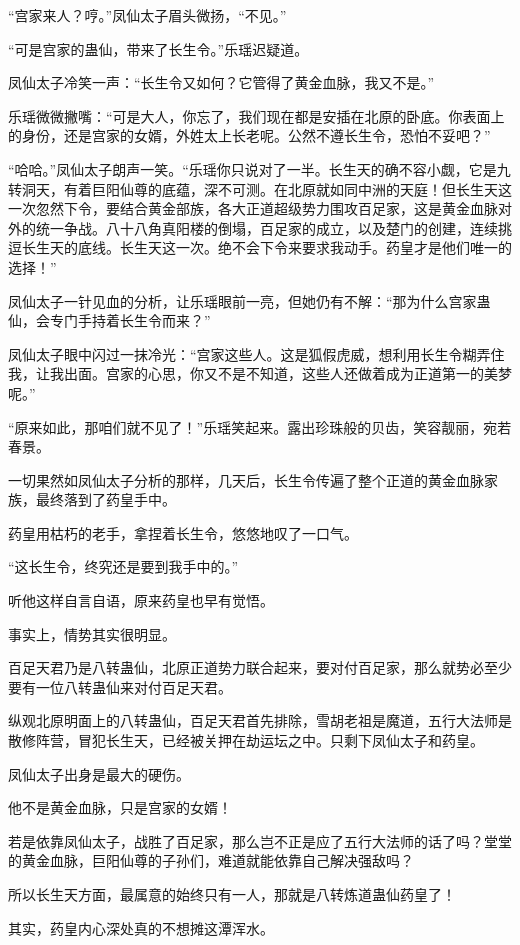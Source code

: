 \begin{this_body}
“宫家来人？哼。”凤仙太子眉头微扬，“不见。”

“可是宫家的蛊仙，带来了长生令。”乐瑶迟疑道。

凤仙太子冷笑一声：“长生令又如何？它管得了黄金血脉，我又不是。”

乐瑶微微撇嘴：“可是大人，你忘了，我们现在都是安插在北原的卧底。你表面上的身份，还是宫家的女婿，外姓太上长老呢。公然不遵长生令，恐怕不妥吧？”

“哈哈。”凤仙太子朗声一笑。“乐瑶你只说对了一半。长生天的确不容小觑，它是九转洞天，有着巨阳仙尊的底蕴，深不可测。在北原就如同中洲的天庭！但长生天这一次忽然下令，要结合黄金部族，各大正道超级势力围攻百足家，这是黄金血脉对外的统一争战。八十八角真阳楼的倒塌，百足家的成立，以及楚门的创建，连续挑逗长生天的底线。长生天这一次。绝不会下令来要求我动手。药皇才是他们唯一的选择！”

凤仙太子一针见血的分析，让乐瑶眼前一亮，但她仍有不解：“那为什么宫家蛊仙，会专门手持着长生令而来？”

凤仙太子眼中闪过一抹冷光：“宫家这些人。这是狐假虎威，想利用长生令糊弄住我，让我出面。宫家的心思，你又不是不知道，这些人还做着成为正道第一的美梦呢。”

“原来如此，那咱们就不见了！”乐瑶笑起来。露出珍珠般的贝齿，笑容靓丽，宛若春景。

一切果然如凤仙太子分析的那样，几天后，长生令传遍了整个正道的黄金血脉家族，最终落到了药皇手中。

药皇用枯朽的老手，拿捏着长生令，悠悠地叹了一口气。

“这长生令，终究还是要到我手中的。”

听他这样自言自语，原来药皇也早有觉悟。

事实上，情势其实很明显。

百足天君乃是八转蛊仙，北原正道势力联合起来，要对付百足家，那么就势必至少要有一位八转蛊仙来对付百足天君。

纵观北原明面上的八转蛊仙，百足天君首先排除，雪胡老祖是魔道，五行大法师是散修阵营，冒犯长生天，已经被关押在劫运坛之中。只剩下凤仙太子和药皇。

凤仙太子出身是最大的硬伤。

他不是黄金血脉，只是宫家的女婿！

若是依靠凤仙太子，战胜了百足家，那么岂不正是应了五行大法师的话了吗？堂堂的黄金血脉，巨阳仙尊的子孙们，难道就能依靠自己解决强敌吗？

所以长生天方面，最属意的始终只有一人，那就是八转炼道蛊仙药皇了！

其实，药皇内心深处真的不想摊这潭浑水。


\end{this_body}
